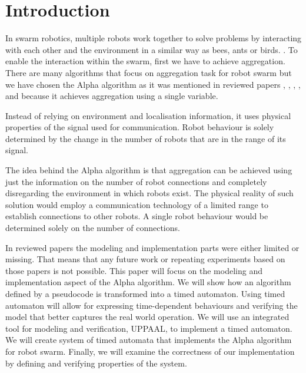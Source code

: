 \section{Introduction}
In swarm robotics, multiple robots work together to solve problems by interacting with each other and the environment in a similar way as bees, ants or birds. \cite{Swarm_Robotic_Behaviors_and_Current_Applications}. To enable the interaction within the swarm, first we have to achieve aggregation. There are many algorithms that focus on aggregation task for robot swarm but we have chosen the Alpha algorithm as it was mentioned in reviewed papers \cite{Towards_Temporal_Verification_of_Emergent_Behaviours_in_Swarm_Robotic_Systems}, \cite{On_Formal_Specification_of_Emergent_Behaviours_in_Swarm_Robotic_Systems}, \cite{Symmetry_Reduction_Enables_Model_Checking_of_More_Complex_Emergent_Behaviours_of_Swarm_Navigation_Algorithms}, \cite{A_Matrix_Based_Approach_For_Modeling_Robotic_Swarm_Behavior}, \cite{Verification_of_visibility-based_properties_on_multiple_moving_robots_in_an_environment_with_obstacles} and because it achieves aggregation using a single variable.

Instead of relying on environment and localisation information, it uses physical properties of the signal used for communication. Robot behaviour is solely determined by the change in the number of robots that are in the range of its signal.

The idea behind the Alpha algorithm is that aggregation can be achieved using just the information on the number of robot connections and completely disregarding the environment in which robots exist. The physical reality of such solution would employ a communication technology of a limited range to establish connections to other robots. A single robot behaviour would be determined solely on the number of connections.

In reviewed papers the modeling and implementation parts were either limited or missing. That means that any future work or repeating experiments based on those papers is not possible. This paper will focus on the modeling and implementation aspect of the Alpha algorithm. We will show how an algorithm defined by a pseudocode is transformed into a timed automaton. Using timed automaton will allow for expressing time-dependent behaviours and verifying the model that better captures the real world operation. We will use an integrated tool for modeling and verification, UPPAAL, to implement a timed automaton. We will create system of timed automata that implements the Alpha algorithm for robot swarm. Finally, we will examine the correctness of our implementation by defining and verifying properties of the system.